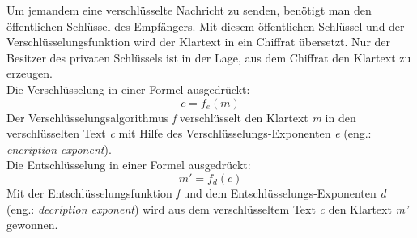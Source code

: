 %
Um jemandem eine verschlüsselte Nachricht zu senden, benötigt man den öffentlichen Schlüssel des Empfängers. Mit diesem öffentlichen Schlüssel und der Verschlüsselungsfunktion wird der Klartext in ein Chiffrat übersetzt. Nur der Besitzer des privaten Schlüssels ist in der Lage, aus dem Chiffrat den Klartext zu erzeugen.\\
Die Verschlüsselung in einer Formel ausgedrückt:
\begin{equation*}
  c = f_e (m)
  \label{eqn:asy_versch}
\end{equation*}
Der Verschlüsselungsalgorithmus \textit{f} verschlüsselt den Klartext \textit{m} in den verschlüsselten Text \textit{c} mit Hilfe des Verschlüsselungs-Exponenten \textit{e} (eng.: \textit{encription exponent}).\\
Die Entschlüsselung in einer Formel ausgedrückt:
\begin{equation*}
  m' = f_d (c) 
  \label{eqn:asy_entsch}
\end{equation*}
Mit der Entschlüsselungsfunktion \textit{f} und dem Entschlüsselungs-Exponenten \textit{d} (eng.: \textit{decription exponent}) wird aus dem verschlüsseltem Text \textit{c} den Klartext \textit{m'} gewonnen.
%
